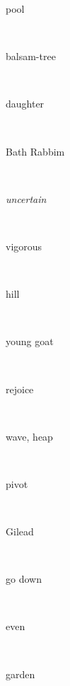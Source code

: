 \documentclass[a4paper]{article}
\begin{document}
\begin{multicols}{4}
\begin{multicols}{4}
\begin{multicols}{5}
{\hebrewfont{}} \begin{english}pool\end{english}\\
{\hebrewfont{}} \begin{english}balsam-tree\end{english}\\
{\hebrewfont{}} \begin{english}daughter\end{english}\\
{\hebrewfont{}} \begin{english}Bath Rabbim\end{english}\\
{\hebrewfont{}} \begin{english}\textit{uncertain}\end{english}\\
{\hebrewfont{}} \begin{english}vigorous\end{english}\\
{\hebrewfont{}} \begin{english}hill\end{english}\\
{\hebrewfont{}} \begin{english}young goat\end{english}\\
{\hebrewfont{}} \begin{english}rejoice\end{english}\\
{\hebrewfont{}} \begin{english}wave, heap\end{english}\\
{\hebrewfont{}} \begin{english}pivot\end{english}\\
{\hebrewfont{}} \begin{english}Gilead\end{english}\\
{\hebrewfont{}} \begin{english}go down\end{english}\\
{\hebrewfont{}} \begin{english}even\end{english}\\
{\hebrewfont{}} \begin{english}garden\end{english}\\

\end{multicols}
\end{multicols}
\end{multicols}
\end{document}
